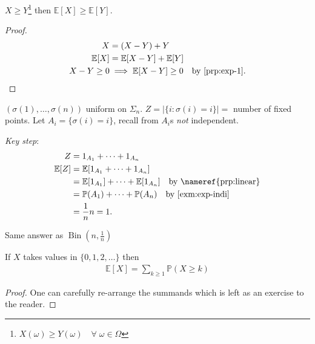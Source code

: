 \begin{corollary}
    $X \geq Y$\footnote{$X(\omega) \geq Y(\omega) \quad \forall \; \omega \in \Omega$} then $\mathbb{E}[X] \geq \mathbb{E}[Y]$.
\end{corollary} 

\begin{proof}
    \begin{align*}
        X &= (X - Y) + Y \\
        \mathbb{E}[X] &= \mathbb{E}[X - Y] + \mathbb{E}[Y] \\
        X - Y \geq 0 &\implies \mathbb{E}[X - Y] \geq 0 \quad \text{by \Cref{prp:exp-1}}.
    \end{align*} 
\end{proof} 

\begin{example}
    $(\sigma(1), \dots, \sigma(n))$ uniform on $\Sigma_n$.
    $Z = |\{i : \sigma(i) = i\}| =$ number of fixed points.
    Let $A_i = \{\sigma(i) = i\}$, \color{blue} recall from  $A_i$s \emph{not} independent. \color{black}

    \emph{Key step}:
    \begin{align*}
        Z &= 1_{A_1} + \dots + 1_{A_n} \\
        \mathbb{E}[Z] &= \mathbb{E}[1_{A_1} + \dots + 1_{A_n}] \\
        &= \mathbb{E}[1_{A_1}] + \dots + \mathbb{E}[1_{A_n}] \quad \text{by \nameref{prp:linear}} \\
        &= \mathbb{P}(A_1) + \dots + \mathbb{P}(A_n) \quad \text{by \Cref{exm:exp-indi}}\\
        &= \frac{1}{n} n = 1.
    \end{align*}
\end{example}

\begin{note}
    Same answer as $\operatorname{Bin}(n, \frac{1}{n})$
\end{note} 

\begin{proposition}
    If $X$ takes values in $\{0, 1, 2, \dots\}$ then
    \begin{align*}
        \mathbb{E}[X] = \sum_{k \geq 1} \mathbb{P}(X \geq k)
    \end{align*} 
\end{proposition} 

\begin{proof}
    One can carefully re-arrange the summands which is left as an exercise to the reader.
\end{proof} 

